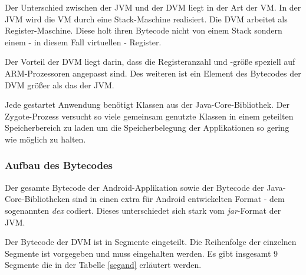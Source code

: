  Der Unterschied zwischen der JVM und der DVM liegt in der Art der VM. In der JVM wird die VM durch eine Stack-Maschine realisiert. Die DVM arbeitet als Register-Maschine. Diese holt ihren Bytecode nicht von einem Stack sondern einem - in diesem Fall virtuellen - Register.
 
 Der Vorteil der DVM liegt darin, dass die Registeranzahl und -größe speziell auf ARM-Prozessoren angepasst sind. Des weiteren ist ein Element des Bytecodes der DVM größer als das der JVM.
 
 Jede gestartet Anwendung benötigt Klassen aus der Java-Core-Bibliothek. Der Zygote-Prozess versucht so viele gemeinsam genutzte Klassen in einem geteilten Speicherbereich zu laden um die Speicherbelegung der Applikationen so gering wie möglich zu halten.
 
\subsubsection{Aufbau des Bytecodes}

Der gesamte Bytecode der Android-Applikation sowie der Bytecode der Java-Core-Bibliotheken sind in einen extra für Android entwickelten Format - dem sogenannten \textit{dex} codiert. Dieses unterschiedet sich stark vom \textit{jar}-Format der JVM.

Der Bytecode der DVM ist in Segmente eingeteilt. Die Reihenfolge der einzelnen Segmente ist vorgegeben und muss eingehalten werden. Es gibt insgesamt 9 Segmente die in der Tabelle \ref{segand} erläutert werden.

